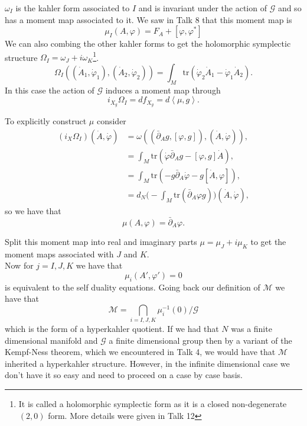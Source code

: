 $\omega_I$ is the kahler form associated to $I$ and is invariant under the action of $\mathcal{G}$ and so has a moment map associated to it. We saw in Talk 8 that this moment map is
\begin{equation}
    \mu_{I}(A, \varphi) = F_A + [\varphi, \varphi^*] 
\end{equation}
We can also combing the other  kahler forms to get the holomorphic symplectic structure $\Omega_I=\omega_{J}+i\omega_{K}$\footnote{ It is called a holomorphic symplectic form as it is a closed non-degenerate $(2,0)$ form. More details were given in Talk 12}.
\begin{equation}
    \Omega_I {((\dot{A}_1, \dot{\varphi}_1) , (\dot{A}_2, \dot{\varphi}_2))} = \int_M \mathrm{tr}(\dot{\varphi}_2 \dot{A}_1 - \dot{\varphi}_1 \dot{A}_2). 
\end{equation}
In this case the action of $\mathcal{G}$ induces a moment map through
\begin{equation}
    i_{X_{g}} \Omega_I = d f_{X_g} = d \left< \mu, g \right>.
\end{equation}
\begin{example}
To explicitly construct $\mu$ consider
\begin{align}
   (i_{X}\Omega_{I})(\dot{A},\dot{\varphi})	&=\omega((\bar{\partial}_{A}g, [\varphi,g]),(\dot{A},\dot{\varphi})),\\
										&=\int_{M}\mathrm{tr}\left(\dot{\varphi}\bar{\partial}_{A}g-[\varphi,g]\dot{A}\right),\\
										&=\int_{M}\mathrm{tr}\left(-g \bar{\partial}_{A}\dot{\varphi}-g[\dot{A},\varphi]\right),\\
										&=d_{N}\Big( -\int_{M}\mathrm{tr}\left(\bar{\partial}_{A}\varphi g\right)\Big)(\dot{A},\dot{\varphi}),
\end{align}
so we have that
\begin{equation} 
\mu(A, \varphi) = \bar{\partial}_{A} \varphi.
\end{equation}
\end{example}
Split this moment map into real and imaginary parts $ \mu = \mu_J + i \mu_K$ to get the moment maps associated with $J$ and $K$.\\
Now for $ j = I,J,K$ we have that 
\begin{equation}
\mu_i ( A', \varphi') = 0
\end{equation}
 is equivalent to the self duality equations. Going back our definition of $\mathcal{M}$ we have that
\begin{equation}
    \mathcal{M} = \bigcap_{i=I,J,K} \mu^{-1}_i (0) / \mathcal{G} 
\end{equation}
which is the form of a hyperkahler quotient. If we had that $N$ was a finite dimensional manifold and $\mathcal{G}$ a finite dimensional group then by a variant of the Kempf-Ness theorem, which we encountered in Talk 4, we would have that $\mathcal{M}$ inherited a hyperkahler structure. However, in the infinite dimensional case we don't have it so easy and need to proceed on a case by case basis.\\



